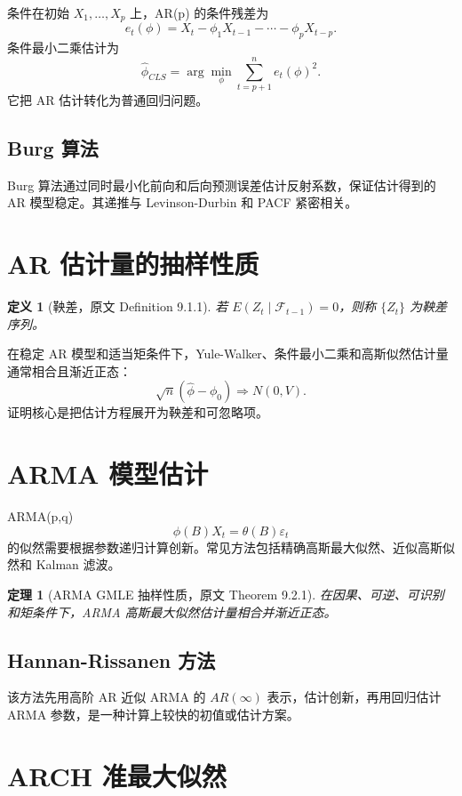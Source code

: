 \documentclass[11pt,a4paper]{ctexart}
\newtheorem{definition}{定义}[section]
\newtheorem{theorem}{定理}[section]
\begin{document}
条件在初始 \(X_1,\ldots,X_p\) 上，AR(p) 的条件残差为
\[
  e_t(\phi)=X_t-\phi_1X_{t-1}-\cdots-\phi_pX_{t-p}.
\]
条件最小二乘估计为
\[
  \hat\phi_{CLS}
  =\arg\min_\phi\sum_{t=p+1}^n e_t(\phi)^2.
\]
它把 AR 估计转化为普通回归问题。

\subsection{Burg 算法}

Burg 算法通过同时最小化前向和后向预测误差估计反射系数，保证估计得到的 AR 模型稳定。其递推与 Levinson-Durbin 和 PACF 紧密相关。

\section{AR 估计量的抽样性质}

\begin{definition}[鞅差，原文 Definition 9.1.1]
若 \(E(Z_t\mid\mathcal F_{t-1})=0\)，则称 \(\{Z_t\}\) 为鞅差序列。
\end{definition}

在稳定 AR 模型和适当矩条件下，Yule-Walker、条件最小二乘和高斯似然估计量通常相合且渐近正态：
\[
  \sqrt n(\hat\phi-\phi_0)\Rightarrow N(0,V).
\]
证明核心是把估计方程展开为鞅差和可忽略项。

\section{ARMA 模型估计}

ARMA(p,q)
\[
  \phi(B)X_t=\theta(B)\varepsilon_t
\]
的似然需要根据参数递归计算创新。常见方法包括精确高斯最大似然、近似高斯似然和 Kalman 滤波。

\begin{theorem}[ARMA GMLE 抽样性质，原文 Theorem 9.2.1]
在因果、可逆、可识别和矩条件下，ARMA 高斯最大似然估计量相合并渐近正态。
\end{theorem}

\subsection{Hannan-Rissanen 方法}

该方法先用高阶 AR 近似 ARMA 的 \(AR(\infty)\) 表示，估计创新，再用回归估计 ARMA 参数，是一种计算上较快的初值或估计方案。

\section{ARCH 准最大似然}
\end{document}
